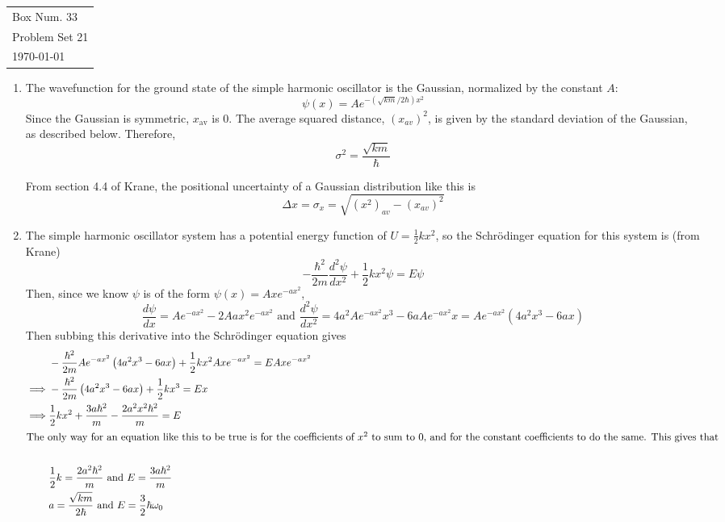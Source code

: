 \documentclass[11pt]{article}
\begin{document}
  \begin{tabular}{l}
    Box Num. 33 \\
    Problem Set 21 \\
    \today
  \end{tabular}

  \begin{enumerate}
    \item The wavefunction for the ground state of the simple harmonic oscillator is the Gaussian, normalized by the constant $A$:
    \begin{equation*}
      \psi(x) = Ae^{-(\sqrt{km}/2\hbar)x^2}
    \end{equation*}
    Since the Gaussian is symmetric, $x_\text{av}$ is 0. The average squared distance, $(x_{av})^2$, is given by the standard deviation of the Gaussian, as described below. Therefore,
    \begin{equation*}
        \sigma^2 = \frac{\sqrt{km}}{\hbar}
    \end{equation*}

    From section 4.4 of Krane, the positional uncertainty of a Gaussian distribution like this is
    \begin{equation*}
        \Delta x = \sigma_x = \sqrt{(x^2)_{av}-(x_{av})^2}
    \end{equation*}

    \item The simple harmonic oscillator system has a potential energy function of $U=\frac{1}{2} k x^2$, so the Schr\"odinger equation for this system is (from Krane)
    \begin{equation*}
      -\frac{\hbar^2}{2m} \frac{d^2 \psi}{dx^2}
      + \frac{1}{2} k x^2 \psi
      = E \psi
    \end{equation*}
    Then, since we know $\psi$ is of the form $\psi(x) = Axe^{-ax^2}$,
    \begin{equation*}
      \frac{d\psi}{dx} = Ae^{-ax^2} - 2Aax^2e^{-ax^2}
      \text{ and }
      \frac{d^2\psi}{dx^2} = 4a^2 A e^{-a x^2} x^3 - 6 a A e^{-a x^2} x =
      Ae^{-a x^2} \left(4a^2x^3 - 6ax\right)
    \end{equation*}
    Then subbing this derivative into the Schr\"odinger equation gives
    \begin{align*}
      &-\frac{\hbar^2}{2m} Ae^{-a x^2} \left(4a^2x^3 - 6ax\right)
      + \frac{1}{2} k x^2 A x e^{-a x^2}
      = E A x e^{-a x^2} \\
      \implies
      &-\frac{\hbar^2}{2m} \left(4a^2x^3 - 6ax\right)
      +\frac{1}{2} k x^3
      =Ex \\
      \implies
      & \frac{1}{2}kx^2 + \frac{3 a \hbar^2}{m} - \frac{2 a^2 x^2 \hbar^2}{m} = E
      \\
      \intertext{The only way for an equation like this to be true is for the coefficients of $x^2$ to sum to 0, and for the constant coefficients to do the same. This gives that} \\
      &\frac{1}{2} k = \frac{2 a^2 \hbar^2}{m} \text{ and } E = \frac{3 a \hbar^2}{m} \\
      & a = \frac{\sqrt{km}}{2\hbar} \text{ and } E = \frac{3}{2} \hbar \omega_0
    \end{align*}


\end{enumerate}
\end{document}
